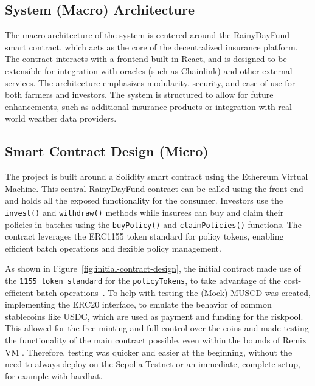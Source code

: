 \documentclass[11pt,a4paper]{article}
\begin{document}
    \subsection{System (Macro) Architecture}\label{subsec:system-architecture}
    The macro architecture of the system is centered around the RainyDayFund smart contract, which acts as the core of the decentralized insurance platform. The contract interacts with a frontend built in React, and is designed to be extensible for integration with oracles (such as Chainlink) and other external services. The architecture emphasizes modularity, security, and ease of use for both farmers and investors. The system is structured to allow for future enhancements, such as additional insurance products or integration with real-world weather data providers.

    \subsection{Smart Contract Design (Micro)}\label{subsec:smart-contract-design}
    The project is built around a Solidity smart contract using the Ethereum Virtual Machine.
    This central RainyDayFund contract can be called using the front end and holds all the exposed functionality for the consumer.
    Investors use the \texttt{invest()} and \texttt{withdraw()} methods while insurees can buy and claim their policies in batches using the \texttt{buyPolicy()} and \texttt{claimPolicies()} functions. The contract leverages the ERC1155 token standard for policy tokens, enabling efficient batch operations and flexible policy management.

    As shown in Figure~\ref{fig:initial-contract-design}, the initial contract made use of the \texttt{1155 token standard} for the \texttt{policyTokens}, to take advantage of the cost-efficient batch operations~\parencite{ERC1155}.
    To help with testing the (Mock)-MUSCD was created, implementing the ERC20 interface, to emulate the behavior of common stablecoins like USDC, which are used as payment and funding for the riskpool.
    This allowed for the free minting and full control over the coins and made testing the functionality of the main contract possible, even within the bounds of Remix VM .
    Therefore, testing was quicker and easier at the beginning, without the need to always deploy on the Sepolia Testnet or an immediate, complete setup, for example with hardhat.
\end{document}
